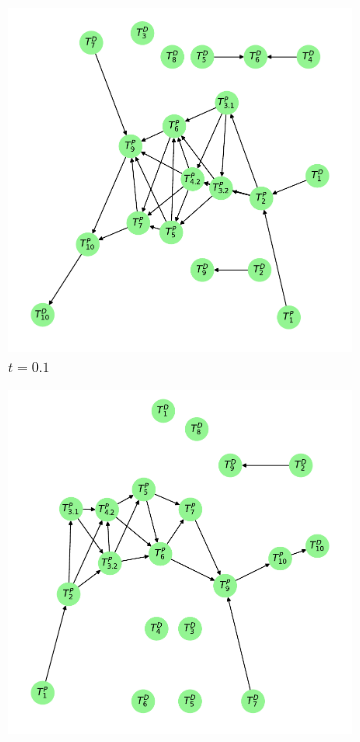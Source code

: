 \documentclass[../Thesis.tex]{subfiles}
\begin{document}
\begin{figure}[ht]
    \centering
    \begin{subfigure}[t]{0.43\linewidth}
        \includegraphics[width = \linewidth]{figures/Cycle data/G_dir times as graph - directed - 0_1.pdf}
        \caption{$t=0.1$}
        \label{subfig:G_dir times directed - graph - t 0.1}
    \end{subfigure}
    \hfill
    \begin{subfigure}[t]{0.43\linewidth}
        \includegraphics[width = \linewidth]{figures/Cycle data/G_dir times as graph - directed - 0_15.pdf}

\end{subfigure}
\end{figure}
\end{document}
